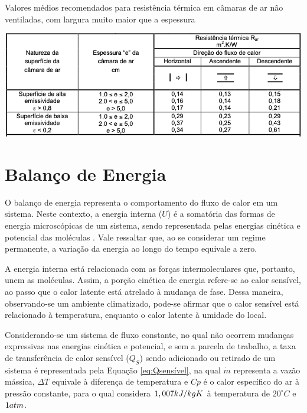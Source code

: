 \documentclass[acronym,symbols,table]{fei}
\begin{document}
\begin{table}[!htb] 
 \centering
    \caption{Valores médios recomendados para resistência térmica em câmaras de ar não ventiladas, com largura muito maior que a espessura}
    \includegraphics[width=1.0\linewidth]{Tabelas/Req_CamaraAr_NBR15220.png}
    \label{tab:Req_Camaras}
\end{table}

\newpage

\section{Balanço de Energia} \label{balenergia}

O balanço de energia representa o comportamento do fluxo de calor em um sistema. Neste contexto, a energia interna ($U$) é a somatória das formas de energia microscópicas de um sistema, sendo representada pelas energias cinética e potencial das moléculas \cite{cengel1998heat}. Vale ressaltar que, ao se considerar um regime permanente, a variação da energia ao longo do tempo equivale a zero.

A energia interna está relacionada com as forças intermoleculares que, portanto, unem as moléculas. Assim, a porção cinética de energia refere-se ao calor sensível, ao passo que o calor latente está atrelado à mudança de fase. Dessa maneira, observando-se um ambiente climatizado, pode-se afirmar que o calor sensível está relacionado à temperatura, enquanto o calor latente à umidade do local.

Considerando-se um sistema de fluxo constante, no qual não ocorrem mudanças expressivas nas energias cinética e potencial, e sem a parcela de trabalho, a taxa de transferência de calor sensível ($\dot{Q}_{S}$) sendo adicionado ou retirado de um sistema é representada pela Equação \ref{eq:Qsensível}, na qual $\dot{m}$ representa a vazão mássica, $\Delta{T}$ equivale à diferença de temperatura e ${Cp}$ é o calor específico do ar à pressão constante, para o qual \textcite{cengel1998heat} considera $1,007 \space kJ/kg K$ à temperatura de $20^\circ C$ e $1 \space atm$. 
\end{document}
